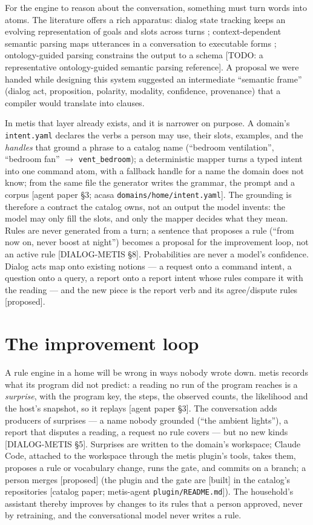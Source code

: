\documentclass[11pt]{article}
\newcommand{\src}[1]{{\footnotesize\textsf{[#1]}}}
\newcommand{\built}{\textsf{\small[built]}}
\newcommand{\proposed}{\textsf{\small[proposed]}}
\newcommand{\todo}[1]{{\color{red}\textsf{\small[TODO: #1]}}}
\begin{document}
For the engine to reason about the conversation, something must turn words into atoms. The
literature offers a rich apparatus: dialog state tracking keeps an evolving representation of
goals and slots across turns \cite{williams2016dstc,henderson2014dstc2}; context-dependent
semantic parsing maps utterances in a conversation to executable forms
\cite{suhr2018context,iyyer2017sqa}; ontology-guided parsing constrains the output to a
schema \todo{a representative ontology-guided semantic parsing reference}. A proposal we were
handed while designing this system suggested an intermediate ``semantic frame''
(dialog act, proposition, polarity, modality, confidence, provenance) that a compiler would
translate into clauses.

In metis that layer already exists, and it is narrower on purpose. A domain's
\texttt{intent.yaml} declares the verbs a person may use, their slots, examples, and the
\emph{handles} that ground a phrase to a catalog name (``bedroom ventilation'', ``bedroom
fan'' $\to$ \texttt{vent\_bedroom}); a deterministic mapper turns a typed intent into one
command atom, with a fallback handle for a name the domain does not know; from the same file
the generator writes the grammar, the prompt and a corpus \src{agent paper \S3;
acasa \texttt{domains/home/intent.yaml}}. The grounding is therefore a contract the
catalog owns, not an output the model invents: the model may only fill the slots, and only
the mapper decides what they mean. Rules are never generated from a turn; a sentence that
proposes a rule (``from now on, never boost at night'') becomes a proposal for the
improvement loop, not an active rule \src{DIALOG-METIS \S8}. Probabilities are never a
model's confidence. Dialog acts map onto existing notions --- a request onto a command
intent, a question onto a query, a report onto a report intent whose rules compare it with
the reading --- and the new piece is the report verb and its agree/dispute rules
\proposed.

\section{The improvement loop}\label{sec:loop}

A rule engine in a home will be wrong in ways nobody wrote down. metis records what its
program did not predict: a reading no run of the program reaches is a \emph{surprise}, with
the program key, the steps, the observed counts, the likelihood and the host's snapshot, so
it replays \src{agent paper \S3}. The conversation adds producers of
surprises --- a name nobody grounded (``the ambient lights''), a report that disputes a
reading, a request no rule covers --- but no new kinds \src{DIALOG-METIS \S5}. Surprises are
written to the domain's workspace; Claude Code, attached to the workspace through the metis
plugin's tools, takes them, proposes a rule or vocabulary change, runs the gate, and commits
on a branch; a person merges \proposed{} (the plugin and the gate are \built{} in the
catalog's repositories \src{catalog paper; metis-agent \texttt{plugin/README.md}}). The
household's assistant thereby improves by changes to its rules that a person approved, never
by retraining, and the conversational model never writes a rule.
\end{document}
